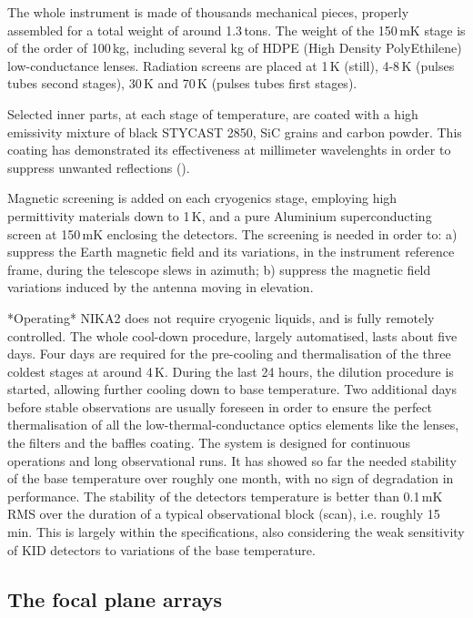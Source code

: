 \documentclass[]{aa} %
\begin{document}
The whole instrument is made of thousands mechanical pieces, properly assembled
for a total weight of around 1.3\,tons. The weight of the 150\,mK stage is of
the order of 100\,kg, including several kg of HDPE (High Density PolyEthilene)
low-conductance lenses. Radiation screens are placed at 1\,K (still), 4-8\,K
(pulses tubes second stages), 30\,K and 70\,K (pulses tubes first stages).

Selected inner parts, at each stage of temperature, are coated with a high
emissivity mixture of black STYCAST 2850, SiC grains and carbon powder. This
coating has demonstrated its effectiveness at millimeter wavelenghts in order to
suppress unwanted reflections (\cite{Calvo2010}).

Magnetic screening is added on each cryogenics stage, employing high
permittivity materials down to 1\,K, and a pure Aluminium superconducting screen
at 150\,mK enclosing the detectors. The screening is needed in order to: a)
suppress the Earth magnetic field and its variations, in the instrument
reference frame, during the telescope slews in azimuth; b) suppress the magnetic
field variations induced by the antenna moving in elevation.

*Operating* NIKA2 does not require cryogenic liquids, and is fully remotely
controlled. The whole cool-down procedure, largely automatised, lasts about five
days. Four days are required for the pre-cooling and thermalisation of the three
coldest stages at around 4\,K. During the last 24 hours, the dilution procedure
is started, allowing further cooling down to base temperature. Two additional
days before stable observations are usually foreseen in order to ensure the
perfect thermalisation of all the low-thermal-conductance optics elements like
the lenses, the filters and the baffles coating. The system is designed for
continuous operations and long observational runs. It has showed so far the
needed stability of the base temperature over roughly one month, with no sign of
degradation in performance. The stability of the detectors temperature is better
than 0.1\,mK RMS over the duration of a typical observational block (scan),
i.e. roughly 15\,min. This is largely within the specifications, also
considering the weak sensitivity of KID detectors to variations of the base
temperature.


 \subsection{The focal plane arrays}
\end{document}
